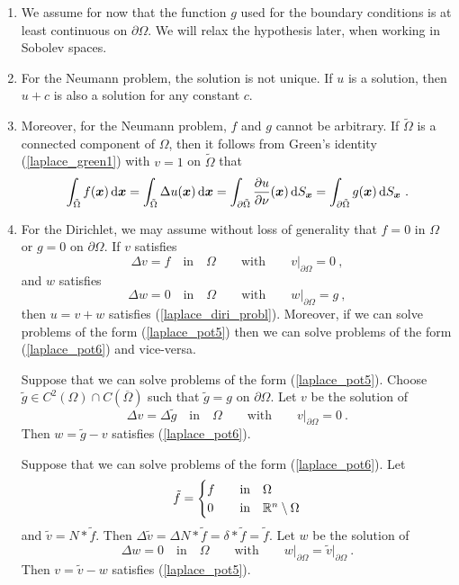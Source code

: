 \begin{enumerate}
\item We assume for now that the function $g$ used for the boundary
conditions is at least continuous on $\partial \Omega$.  We will
relax the hypothesis later, when working in Sobolev spaces.
\item For the Neumann problem, the solution is not unique.  If $u$ is
a solution, then $u+c$ is also a solution for any constant $c$.
\item Moreover, for the Neumann problem, $f$ and $g$ cannot be
arbitrary.  If $\tilde{\Omega}$ is a connected component of $\Omega$, then it
follows from Green's identity (\ref{laplace_green1}) with $v=1$ on
$\tilde{\Omega}$ that
\[
\int_{\tilde{\Omega}} f(\VEC{x}) \dx{\VEC{x}}
= \int_{\tilde{\Omega}} \Delta u(\VEC{x}) \dx{\VEC{x}}
= \int_{\partial \tilde{\Omega}} \pdydx{u}{\nu}(\VEC{x}) \dss{S}{x}
= \int_{\partial \tilde{\Omega}} g(\VEC{x}) \dss{S}{x} \ .
\]
\item For the Dirichlet, we may assume without loss of generality that
$f=0$ in $\Omega$ or $g=0$ on $\partial \Omega$.
If $v$ satisfies
\begin{equation} \label{laplace_pot5}
\Delta v = f \quad \text{in} \quad \Omega \qquad \text{with}
\qquad v\big|_{\partial \Omega} = 0 \ ,
\end{equation}
and $w$ satisfies
\begin{equation} \label{laplace_pot6}
\Delta w = 0 \quad \text{in} \quad \Omega \qquad \text{with}
\qquad w\big|_{\partial \Omega} = g \ ,
\end{equation}
then $u=v+w$ satisfies (\ref{laplace_diri_probl}).  Moreover, if we
can solve problems of the form (\ref{laplace_pot5}) then we can solve
problems of the form (\ref{laplace_pot6}) and vice-versa.

Suppose that we can solve problems of the form (\ref{laplace_pot5}).
Choose $\displaystyle \tilde{g} \in C^2(\Omega) \cap C(\overline{\Omega})$
such that $\tilde{g} = g$ on $\partial \Omega$.  Let $v$ be the solution of
\[
\Delta v = \Delta \tilde{g} \quad \text{in} \quad \Omega \qquad \text{with}
\qquad v\big|_{\partial \Omega} = 0 \ .
\]
Then $w=\tilde{g}-v$ satisfies (\ref{laplace_pot6}).

Suppose that we can solve problems of the form (\ref{laplace_pot6}).
Let
\[
\tilde{f} =
\begin{cases}
f & \quad \text{in} \quad \Omega \\
0 & \quad \text{in} \quad \mathbb{R}^n\setminus \Omega
\end{cases}
\]
and $\tilde{v} = N\ast \tilde{f}$.  Then
$\displaystyle
\Delta \tilde{v} = \Delta N \ast \tilde{f} = \delta \ast \tilde{f} =
\tilde{f}$.  Let $w$ be the solution of
\[
\Delta w = 0 \quad \text{in} \quad \Omega \qquad \text{with}
\qquad w\big|_{\partial \Omega} = \tilde{v}\big|_{\partial \Omega} \ .
\]
Then $v=\tilde{v}-w$ satisfies (\ref{laplace_pot5}).


\end{enumerate}
